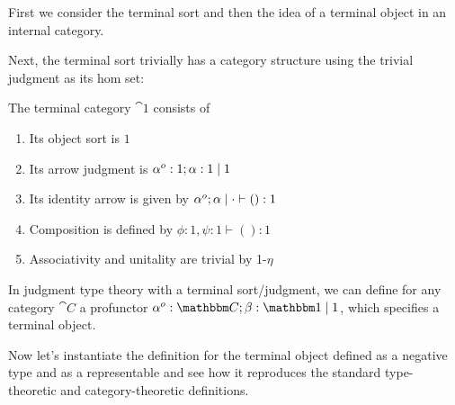 \documentclass{article}
\begin{document}


First we consider the terminal sort and then the idea of a terminal
object in an internal category.

Next, the terminal sort trivially has a category structure using the
trivial judgment as its hom set:

\begin{definition}
  The terminal category $\cat 1$ consists of
  \begin{enumerate}
  \item Its object sort is $1$
  \item Its arrow judgment is $\alpha^o:1;\alpha:1 \mathrel{|} 1$
  \item Its identity arrow is given by $\alpha^o;\alpha \mathrel{|} \cdot \vdash () : 1$
  \item Composition is defined by $\phi : 1, \psi : 1 \vdash () : 1$
  \item Associativity and unitality are trivial by \textsc{1-$\eta$}
  \end{enumerate}
\end{definition}

\begin{definition}
  In judgment type theory with a terminal sort/judgment, we can define
  for any category $\cat C$ a profunctor $\alpha^o:\cat C;\beta : \cat
  1 \pipe 1$, which specifies a terminal object.
\end{definition}

Now let's instantiate the definition for the terminal object defined
as a negative type and as a representable and see how it reproduces
the standard type-theoretic and category-theoretic definitions.
\end{document}
